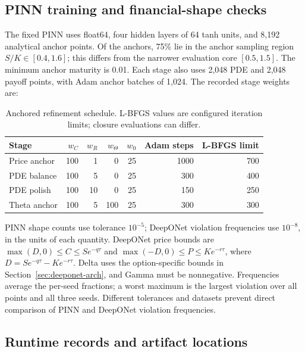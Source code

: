 \documentclass[11pt,a4paper]{article}
\begin{document}
\subsection{PINN training and financial-shape checks}
The fixed PINN uses float64, four hidden layers of 64 tanh units, and 8,192 analytical anchor points. Of the anchors, 75\% lie in the anchor sampling region $S/K\in[0.4,1.6]$; this differs from the narrower evaluation core $[0.5,1.5]$. The minimum anchor maturity is 0.01. Each stage also uses 2,048 PDE and 2,048 payoff points, with Adam anchor batches of 1,024. The recorded stage weights are:

\begin{table}[!ht]\centering\small
\caption{Anchored refinement schedule. L-BFGS values are configured iteration limits; closure evaluations can differ.}
\begin{tabular}{lrrrrrr}\toprule
Stage & $w_C$ & $w_R$ & $w_\Theta$ & $w_0$ & Adam steps & L-BFGS limit\\\midrule
Price anchor & 100 & 1 & 0 & 25 & 1000 & 700\\
PDE balance & 100 & 5 & 0 & 25 & 300 & 400\\
PDE polish & 100 & 10 & 0 & 25 & 150 & 250\\
Theta anchor & 100 & 5 & 100 & 25 & 300 & 300\\\bottomrule
\end{tabular}\end{table}

PINN shape counts use tolerance $10^{-5}$; DeepONet violation frequencies use $10^{-8}$, in the units of each quantity. DeepONet price bounds are $\max(D,0)\le C\le Se^{-q\tau}$ and $\max(-D,0)\le P\le Ke^{-r\tau}$, where $D=Se^{-q\tau}-Ke^{-r\tau}$. Delta uses the option-specific bounds in Section~\ref{sec:deeponet-arch}, and Gamma must be nonnegative. Frequencies average the per-seed fractions; a worst maximum is the largest violation over all points and all three seeds. Different tolerances and datasets prevent direct comparison of PINN and DeepONet violation frequencies.

\subsection{Runtime records and artifact locations}
\end{document}
